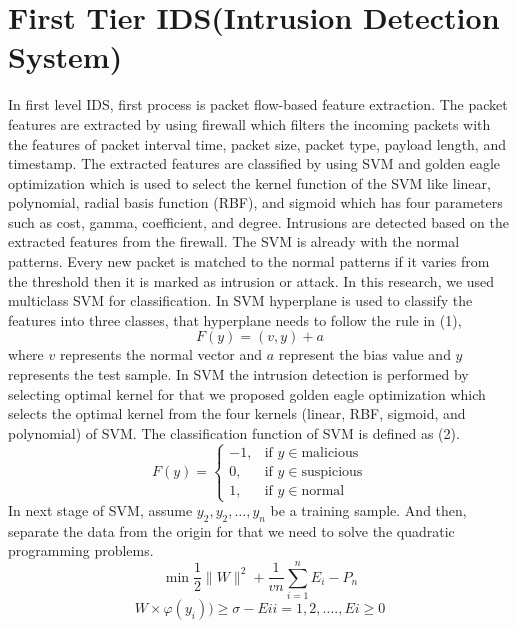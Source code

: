 \documentclass[conference]{IEEEtran}
\begin{document}
\section{First Tier IDS(Intrusion Detection System)}
In first level IDS, first process is packet flow-based feature extraction. The packet features are extracted by using firewall which filters the incoming packets with the features of packet interval time, packet size, packet type, payload length, and timestamp. The extracted features are classified by using SVM and golden eagle optimization which is used to select the kernel function of the SVM like linear, polynomial, radial basis function (RBF), and sigmoid which has four parameters such as cost, gamma, coefficient, and degree. Intrusions are detected based on the extracted features from the firewall. The SVM is already with the normal patterns. Every new packet is matched to the normal patterns if it varies from the threshold then it is marked as intrusion or attack. In this research, we used multiclass SVM for classification. In SVM hyperplane is used to classify the features into three classes, that hyperplane needs to follow the rule in (1),
\begin{equation}
F(y) = (v, y) + a
\end{equation}
where $v$ represents the normal vector and $a$ represent the bias value and $y$ represents the test sample. In SVM the intrusion detection is performed by selecting optimal kernel for that we proposed golden eagle optimization which selects the optimal kernel from the four kernels (linear, RBF, sigmoid, and polynomial) of SVM. The classification function of SVM is defined as (2).
\begin{equation}
F(y) =
\begin{cases} 
-1, & \text{if } y \in \text{malicious} \\ 
0, & \text{if } y \in \text{suspicious} \\ 
1, & \text{if } y \in \text{normal} 
\end{cases}
\end{equation}
In next stage of SVM, assume $y_2, y_2, \ldots, y_n$ be a training sample. And then, separate the data from the origin for that we need to solve the quadratic programming problems.
\begin{equation}
\min \frac{1}{2} \|W\|^2 + \frac{1}{v n} \sum_{i=1}^{n} E_i - P_n
\end{equation}
\begin{equation}
W \times \varphi(y_i)) \ge \sigma - Eii = 1, 2, ... . , Ei \ge 0
\end{equation}
\end{document}
